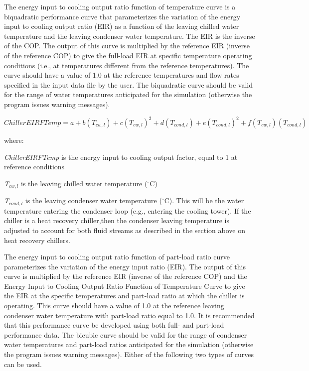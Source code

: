 The energy input to cooling output ratio function of temperature curve is a biquadratic performance curve that parameterizes the variation of the energy input to cooling output ratio (EIR) as a function of the leaving chilled water temperature and the leaving condenser water temperature. The EIR is the inverse of the COP. The output of this curve is multiplied by the reference EIR (inverse of the reference COP) to give the full-load EIR at specific temperature operating conditions (i.e., at temperatures different from the reference temperatures). The curve should have a value of 1.0 at the reference temperatures and flow rates specified in the input data file by the user. The biquadratic curve should be valid for the range of water temperatures anticipated for the simulation (otherwise the program issues warning messages).

\begin{equation}
ChillerEIRFTemp = a + b({T_{cw,l}}) + c{({T_{cw,l}})^2} + d({T_{cond,l}}) + e{({T_{cond,l}})^2} + f({T_{cw,l}})({T_{cond,l}})
\end{equation}

where:

\emph{ChillerEIRFTemp} is the energy input to cooling output factor, equal to 1 at reference conditions

\emph{T\(_{cw,l}\)} is the leaving chilled water temperature (\(^{\circ}\)C)

\emph{T\(_{cond,l}\)} is the leaving condenser water temperature (\(^{\circ}\)C). This will be the water temperature entering the condenser loop (e.g., entering the cooling tower). If the chiller is a heat recovery chiller,then the condenser leaving temperature is adjusted to account for both fluid streams as described in the section above on heat recovery chillers.

The energy input to cooling output ratio function of part-load ratio curve parameterizes the variation of the energy input ratio (EIR). The output of this curve is multiplied by the reference EIR (inverse of the reference COP) and the Energy Input to Cooling Output Ratio Function of Temperature Curve to give the EIR at the specific temperatures and part-load ratio at which the chiller is operating. This curve should have a value of 1.0 at the reference leaving condenser water temperature with part-load ratio equal to 1.0. It is recommended that this performance curve be developed using both full- and part-load performance data. The bicubic curve should be valid for the range of condenser water temperatures and part-load ratios anticipated for the simulation (otherwise the program issues warning messages). Either of the following two types of curves can be used.

